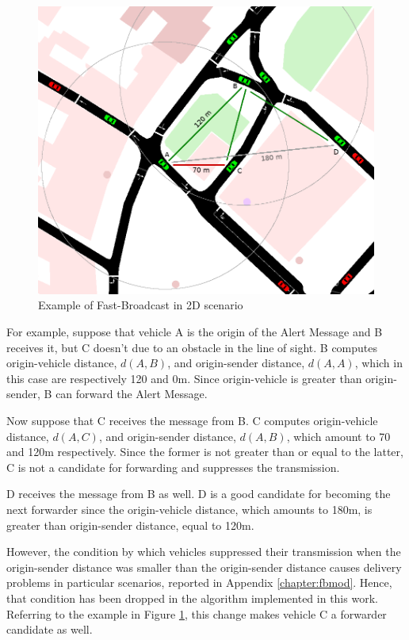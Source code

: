 		\begin{figure}[H]
			\centering
			\includegraphics[width=\textwidth]{immagini/fb-2dpicc}
			\caption{Example of Fast-Broadcast in 2D scenario}
			\label{fig:fb-2d}
		\end{figure}
		
		
		
		For example, suppose that vehicle A is the origin of the Alert Message and B receives it, but C doesn't due to an obstacle in the line of sight. B computes origin-vehicle distance, $d(A, B)$, and origin-sender distance, $d(A, A)$, which in this case are respectively 120 and 0m. Since origin-vehicle is greater than origin-sender, B can forward the Alert Message.
		
		
		Now suppose that C receives the message from B. C computes origin-vehicle distance, $d(A, C)$, and origin-sender distance, $d(A, B)$, which amount to 70 and 120m respectively. Since the former is not greater than or equal to the latter, C is not a candidate for forwarding and suppresses the transmission.
		
		
		D receives the message from B as well. D is a good candidate for becoming the next forwarder since the origin-vehicle distance, which amounts to 180m, is greater than origin-sender distance, equal to 120m.
		
		However, the condition by which vehicles suppressed their transmission when the origin-sender distance was smaller than the origin-sender distance causes delivery problems in particular scenarios, reported in Appendix \ref{chapter:fbmod}. Hence, that condition has been dropped in the algorithm implemented in this work. Referring to the example in Figure \ref{fig:fb-2d}, this change makes vehicle C a forwarder candidate as well.
		
